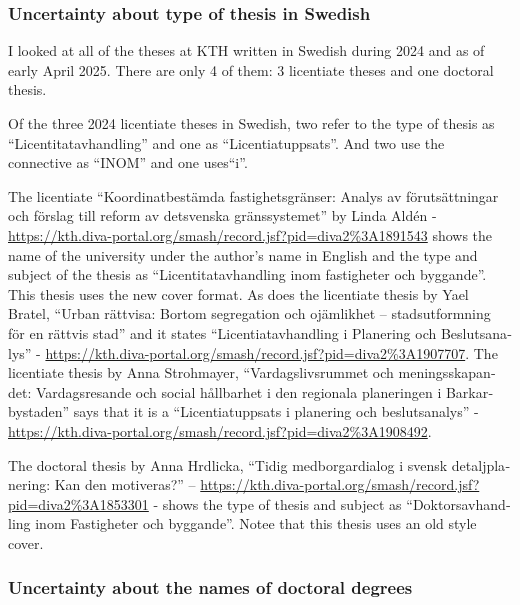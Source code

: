 \documentclass[12pt, twoside]{article}
\begin{document}
\subsubsection{Uncertainty about type of thesis in Swedish}
\label{sec:cycleSwedishLicentiateThesisType}

I looked at all of the theses at KTH written in Swedish during 2024 and as of early April 2025. There are only 4 of them: 3 licentiate theses and one doctoral thesis.

Of the three 2024 licentiate theses in Swedish, two refer to the type of thesis as ``\foreignlanguage{swedish}{Licentitatavhandling}'' and one as ``\foreignlanguage{swedish}{Licentiatuppsats}''. And two use the connective as ``\foreignlanguage{swedish}{INOM}'' and one uses``\foreignlanguage{swedish}{i}''.

The licentiate ``\foreignlanguage{swedish}{Koordinatbestämda fastighetsgränser: Analys av förutsättningar och förslag till reform av detsvenska gränssystemet}'' by Linda Aldén - \url{https://kth.diva-portal.org/smash/record.jsf?pid=diva2%3A1891543} shows the name of the university under the author's name in English and the type and subject of the thesis  as ``\foreignlanguage{swedish}{Licentitatavhandling inom fastigheter och byggande}''. This thesis uses the new cover format.
As does the licentiate thesis by Yael Bratel, ``\foreignlanguage{swedish}{Urban rättvisa: Bortom segregation och ojämlikhet – stadsutformning för en rättvis stad}'' and it states ``\foreignlanguage{swedish}{Licentiatavhandling i Planering och Beslutsanalys}'' - \url{https://kth.diva-portal.org/smash/record.jsf?pid=diva2%3A1907707}.
The licentiate thesis by Anna Strohmayer, ``\foreignlanguage{swedish}{Vardagslivsrummet och meningsskapandet: Vardagsresande och social hållbarhet i den regionala planeringen i Barkarbystaden}'' says that it is a ``\foreignlanguage{swedish}{Licentiatuppsats i planering och beslutsanalys}'' - \url{https://kth.diva-portal.org/smash/record.jsf?pid=diva2%3A1908492}. 

The doctoral thesis by Anna Hrdlicka, ``\foreignlanguage{swedish}{Tidig medborgardialog i svensk detaljplanering: Kan den motiveras?}'' 
-- \url{https://kth.diva-portal.org/smash/record.jsf?pid=diva2%3A1853301} - shows the type of thesis and subject as ``\foreignlanguage{swedish}{Doktorsavhandling inom Fastigheter och byggande}''. Notee that this thesis uses an old style cover.

\subsubsection{Uncertainty about the names of doctoral degrees}
\label{sec:cycleDoctoralDegreeQuestion}
\end{document}
